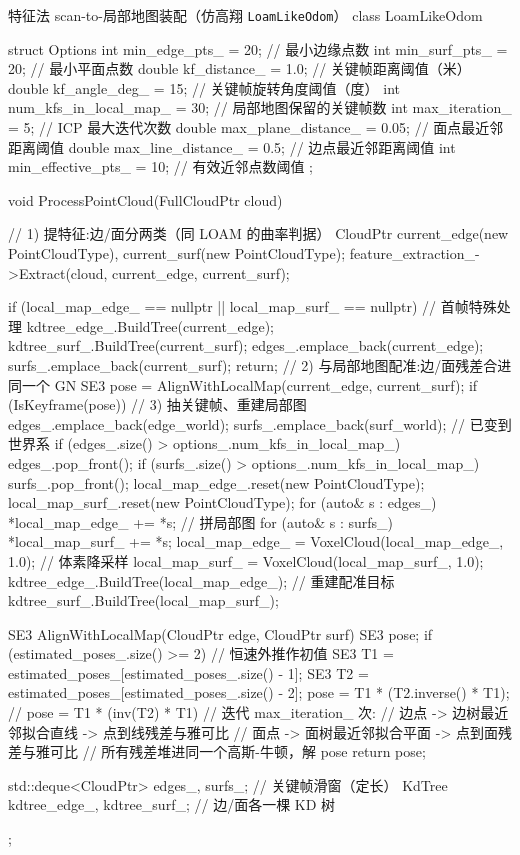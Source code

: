\begin{codebox}[C++]{特征法 scan-to-局部地图装配（仿高翔 \texttt{LoamLikeOdom}）}
class LoamLikeOdom {
  struct Options {
    int    min_edge_pts_ = 20;          // 最小边缘点数
    int    min_surf_pts_ = 20;          // 最小平面点数
    double kf_distance_ = 1.0;          // 关键帧距离阈值（米）
    double kf_angle_deg_ = 15;          // 关键帧旋转角度阈值（度）
    int    num_kfs_in_local_map_ = 30;  // 局部地图保留的关键帧数
    int    max_iteration_ = 5;          // ICP 最大迭代次数
    double max_plane_distance_ = 0.05;  // 面点最近邻距离阈值
    double max_line_distance_ = 0.5;    // 边点最近邻距离阈值
    int    min_effective_pts_ = 10;     // 有效近邻点数阈值
  };

  void ProcessPointCloud(FullCloudPtr cloud) {
    // 1) 提特征:边/面分两类（同 LOAM 的曲率判据）
    CloudPtr current_edge(new PointCloudType), current_surf(new PointCloudType);
    feature_extraction_->Extract(cloud, current_edge, current_surf);

    if (local_map_edge_ == nullptr || local_map_surf_ == nullptr) {   // 首帧特殊处理
      kdtree_edge_.BuildTree(current_edge);
      kdtree_surf_.BuildTree(current_surf);
      edges_.emplace_back(current_edge); surfs_.emplace_back(current_surf);
      return;
    }
    // 2) 与局部地图配准:边/面残差合进同一个 GN
    SE3 pose = AlignWithLocalMap(current_edge, current_surf);
    if (IsKeyframe(pose)) {                                            // 3) 抽关键帧、重建局部图
      edges_.emplace_back(edge_world); surfs_.emplace_back(surf_world);     // 已变到世界系
      if (edges_.size() > options_.num_kfs_in_local_map_) edges_.pop_front();
      if (surfs_.size() > options_.num_kfs_in_local_map_) surfs_.pop_front();
      local_map_edge_.reset(new PointCloudType); local_map_surf_.reset(new PointCloudType);
      for (auto& s : edges_) *local_map_edge_ += *s;                   // 拼局部图
      for (auto& s : surfs_) *local_map_surf_ += *s;
      local_map_edge_ = VoxelCloud(local_map_edge_, 1.0);             // 体素降采样
      local_map_surf_ = VoxelCloud(local_map_surf_, 1.0);
      kdtree_edge_.BuildTree(local_map_edge_);                        // 重建配准目标
      kdtree_surf_.BuildTree(local_map_surf_);
    }
  }

  SE3 AlignWithLocalMap(CloudPtr edge, CloudPtr surf) {
    SE3 pose;
    if (estimated_poses_.size() >= 2) {            // 恒速外推作初值
      SE3 T1 = estimated_poses_[estimated_poses_.size() - 1];
      SE3 T2 = estimated_poses_[estimated_poses_.size() - 2];
      pose = T1 * (T2.inverse() * T1);             // pose = T1 * (inv(T2) * T1)
    }
    // 迭代 max_iteration_ 次:
    //   边点 -> 边树最近邻拟合直线 -> 点到线残差与雅可比
    //   面点 -> 面树最近邻拟合平面 -> 点到面残差与雅可比
    //   所有残差堆进同一个高斯-牛顿，解 pose
    return pose;
  }

  std::deque<CloudPtr> edges_, surfs_;             // 关键帧滑窗（定长）
  KdTree kdtree_edge_, kdtree_surf_;               // 边/面各一棵 KD 树
};
\end{codebox}


